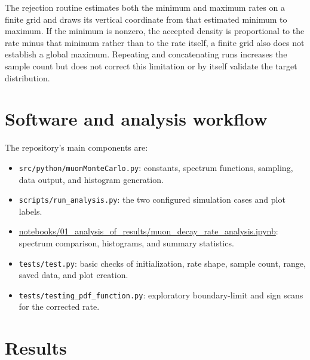 \documentclass[conference]{IEEEtran}
\begin{document}
The rejection routine estimates both the minimum and maximum rates on a finite grid and draws its vertical coordinate from that estimated minimum to maximum. If the minimum is nonzero, the accepted density is proportional to the rate minus that minimum rather than to the rate itself, a finite grid also does not establish a global maximum. Repeating and concatenating runs increases the sample count but does not correct this limitation or by itself validate the target distribution.

\section{Software and analysis workflow}

The repository's main components are:
\begin{itemize}
    \item \texttt{src/python/muonMonteCarlo.py}: constants, spectrum functions, sampling, data output, and histogram generation.
    \item \texttt{scripts/run\_analysis.py}: the two configured simulation cases and plot labels.
    \item \url{notebooks/01_analysis_of_results/muon_decay_rate_analysis.ipynb}: spectrum comparison, histograms, and summary statistics.
    \item \texttt{tests/test.py}: basic checks of initialization, rate shape, sample count, range, saved data, and plot creation.
    \item \texttt{tests/testing\_pdf\_function.py}: exploratory boundary-limit and sign scans for the corrected rate.
\end{itemize}

\section{Results}
\end{document}
